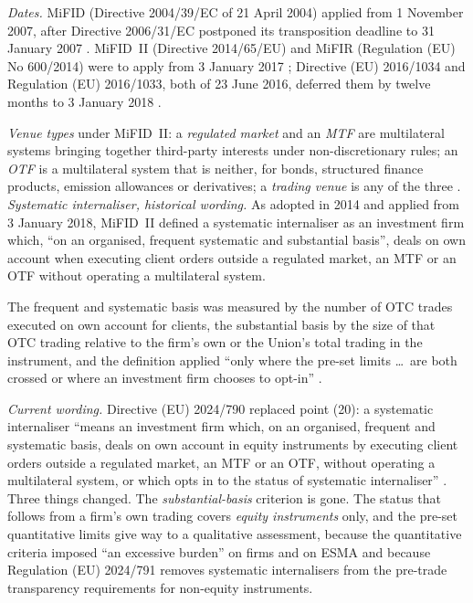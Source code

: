 \begin{qfrule}\label{rule:eu-trading-venue-transparency}
 \emph{Dates.} MiFID (Directive 2004/39/EC of 21 April 2004) applied from 1 November 2007, after Directive 2006/31/EC postponed its transposition deadline to 31 January 2007 \citep[Art.~1, points (4)--(5)]{eu-dir-2006-31}. MiFID~II (Directive 2014/65/EU) and MiFIR (Regulation (EU) No 600/2014) were to apply from 3 January 2017 \citep[Art.~93]{eu-dir-2014-65} \citep[Art.~55]{eu-reg-600-2014}; Directive (EU) 2016/1034 and Regulation (EU) 2016/1033, both of 23 June 2016, deferred them by twelve months to 3 January 2018 \citep[Art.~1, points (7)--(8)]{eu-dir-2016-1034} \citep[recital and Art.~1]{eu-reg-2016-1033}.

\emph{Venue types} under MiFID~II: a \emph{regulated market} and an \emph{MTF} are multilateral systems bringing together third-party interests under non-discretionary rules; an \emph{OTF} is a multilateral system that is neither, for bonds, structured finance products, emission allowances or derivatives; a \emph{trading venue} is any of the three \citep[Art.~4(1), points (21)--(24)]{eu-dir-2014-65}. \emph{Systematic internaliser, historical wording.} As adopted in 2014 and applied from 3 January 2018, MiFID~II defined a systematic internaliser as an investment firm which, ``on an organised, frequent systematic and substantial basis'', deals on own account when executing client orders outside a regulated market, an MTF or an OTF without operating a multilateral system.

The frequent and systematic basis was measured by the number of OTC trades executed on own account for clients, the substantial basis by the size of that OTC trading relative to the firm's own or the Union's total trading in the instrument, and the definition applied ``only where the pre-set limits \dots\ are both crossed or where an investment firm chooses to opt-in'' \citep[Art.~4(1), point (20)]{eu-dir-2014-65}.

\emph{Current wording.} Directive (EU) 2024/790 replaced point (20): a systematic internaliser ``means an investment firm which, on an organised, frequent and systematic basis, deals on own account in equity instruments by executing client orders outside a regulated market, an MTF or an OTF, without operating a multilateral system, or which opts in to the status of systematic internaliser'' \citep[Art.~1, point (3)(b)]{eu-dir-2024-790}. Three things changed. The \emph{substantial-basis} criterion is gone. The status that follows from a firm's own trading covers \emph{equity instruments} only, and the pre-set quantitative limits give way to a qualitative assessment, because the quantitative criteria imposed ``an excessive burden'' on firms and on ESMA and because Regulation (EU) 2024/791 removes systematic internalisers from the pre-trade transparency requirements for non-equity instruments.


\end{qfrule}
